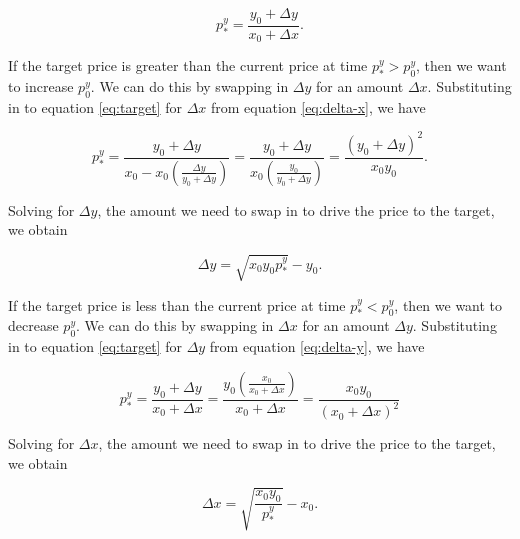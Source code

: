 \documentclass[a4paper, 11pt]{article}
\begin{document}
\begin{equation}
\label{eq:target}
p^y_* 
= 
\frac{y_0 + \Delta y}{x_0 + \Delta x}.
\end{equation}

If the target price is greater than the current price at time $p^y_*  > p^y_0$, then we want to increase $p^y_0$. We can do this by swapping in $\Delta y$ for an amount $\Delta x$. Substituting in to equation \eqref{eq:target} for $\Delta x$ from equation \eqref{eq:delta-x}, we have

\begin{equation}
p^y_* 
= 
\frac{y_0 + \Delta y}{x_0 - x_0 \left(  \frac{\Delta y}{y_0 + \Delta y} \right)}
=
\frac{y_0 + \Delta y}{x_0 \left(  \frac{y_0}{y_0 + \Delta y} \right)}
=
\frac{(y_0 + \Delta y)^2}{x_0 y_0}.
\end{equation}

Solving for $\Delta y$, the amount we need to swap in to drive the price to the target, we obtain

\begin{equation}
\Delta y
=
\sqrt{x_0 y_0 p^y_*} - y_0.
\end{equation}

If the target price is less than the current price at time $p^y_*  < p^y_0$, then we want to decrease $p^y_0$. We can do this by swapping in $\Delta x$ for an amount $\Delta y$. Substituting in to equation \eqref{eq:target} for $\Delta y$ from equation \eqref{eq:delta-y}, we have

\begin{equation}
p^y_* 
= 
\frac{y_0 + \Delta y}{x_0 + \Delta x}
=
\frac{y_0 \left(  \frac{x_0}{x_0 + \Delta x} \right)}{x_0 + \Delta x}
=
\frac{x_0 y_0}{(x_0 + \Delta x)^2}
\end{equation}

Solving for $\Delta x$, the amount we need to swap in to drive the price to the target, we obtain

\begin{equation}
\Delta x
=
\sqrt{\frac{x_0 y_0}{p^y_*}} - x_0.
\end{equation}
\end{document}
